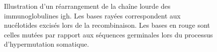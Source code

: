 \begin{figure}[H]
    \caption{Illustration d'un réarrangement de la chaîne lourde des immunoglobulines \gls{igh}.
    Les bases rayées correspondent aux nucélotides excisés lors de la recombinaison. 
    Les bases en rouge sont celles mutées par rapport aux séquences germinales lors du 
    processus d'hypermutation somatique.}
    \label{fig:igh}
\end{figure}

